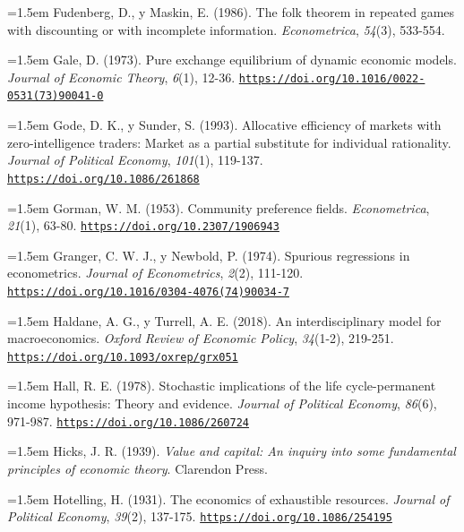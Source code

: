 \documentclass[10pt,a4paper]{article}
\begin{document}
\noindent\hangindent=1.5em Fudenberg, D., y Maskin, E. (1986). The folk theorem in repeated games with discounting or with incomplete information. \textit{Econometrica}, \textit{54}(3), 533-554.

\noindent\hangindent=1.5em Gale, D. (1973). Pure exchange equilibrium of dynamic economic models. \textit{Journal of Economic Theory}, \textit{6}(1), 12-36. \href{https://doi.org/10.1016/0022-0531(73)90041-0}{\nolinkurl{https://doi.org/10.1016/0022-0531(73)90041-0}}

\noindent\hangindent=1.5em Gode, D. K., y Sunder, S. (1993). Allocative efficiency of markets with zero-intelligence traders: Market as a partial substitute for individual rationality. \textit{Journal of Political Economy}, \textit{101}(1), 119-137. \href{https://doi.org/10.1086/261868}{\nolinkurl{https://doi.org/10.1086/261868}}

\noindent\hangindent=1.5em Gorman, W. M. (1953). Community preference fields. \textit{Econometrica}, \textit{21}(1), 63-80. \href{https://doi.org/10.2307/1906943}{\nolinkurl{https://doi.org/10.2307/1906943}}

\noindent\hangindent=1.5em Granger, C. W. J., y Newbold, P. (1974). Spurious regressions in econometrics. \textit{Journal of Econometrics}, \textit{2}(2), 111-120. \href{https://doi.org/10.1016/0304-4076(74)90034-7}{\nolinkurl{https://doi.org/10.1016/0304-4076(74)90034-7}}

\noindent\hangindent=1.5em Haldane, A. G., y Turrell, A. E. (2018). An interdisciplinary model for macroeconomics. \textit{Oxford Review of Economic Policy}, \textit{34}(1-2), 219-251. \href{https://doi.org/10.1093/oxrep/grx051}{\nolinkurl{https://doi.org/10.1093/oxrep/grx051}}

\noindent\hangindent=1.5em Hall, R. E. (1978). Stochastic implications of the life cycle-permanent income hypothesis: Theory and evidence. \textit{Journal of Political Economy}, \textit{86}(6), 971-987. \href{https://doi.org/10.1086/260724}{\nolinkurl{https://doi.org/10.1086/260724}}

\noindent\hangindent=1.5em Hicks, J. R. (1939). \textit{Value and capital: An inquiry into some fundamental principles of economic theory}. Clarendon Press.

\noindent\hangindent=1.5em Hotelling, H. (1931). The economics of exhaustible resources. \textit{Journal of Political Economy}, \textit{39}(2), 137-175. \href{https://doi.org/10.1086/254195}{\nolinkurl{https://doi.org/10.1086/254195}}
\end{document}
